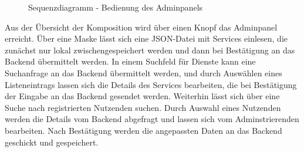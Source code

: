 \begin{figure}[h]
	\centering
	\caption{Sequenzdiagramm - Bedienung des Adminpanels}
	\label{fig:sequenz-adminPanel}
\end{figure}
\noindent
Aus der Übersicht der Komposition wird über einen Knopf das Adminpanel erreicht. Über eine Maske lässt sich eine JSON-Datei mit Services einlesen, die zunächst nur lokal zwischengespeichert werden und dann bei Bestätigung an das Backend übermittelt werden. In einem Suchfeld für Dienste kann eine Suchanfrage an das Backend übermittelt werden, und durch Auswählen eines Listeneintrags lassen sich die Details des Services bearbeiten, die bei Bestätigung der Eingabe an das Backend gesendet werden. Weiterhin lässt sich über eine Suche nach registrierten Nutzenden suchen. Durch Auswahl eines Nutzenden werden die Details vom Backend abgefragt und lassen sich vom Adminstrierenden bearbeiten. Nach Bestätigung werden die angepassten Daten an das Backend geschickt und gespeichert.
